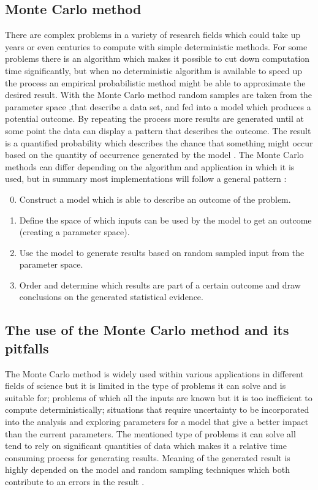 \subsection{Monte Carlo method}
There are complex problems in a variety of research fields which could take up years or even centuries to compute with simple deterministic methods. For some problems there is an algorithm which makes it possible to cut down computation time significantly, but when no deterministic algorithm is available to speed up the process an empirical probabilistic method might be able to approximate the desired result. With the Monte Carlo method random samples are taken from the parameter space ,that describe a data set, and fed into a model which produces a potential outcome. By repeating the process more results are generated until at some point the data can display a pattern that describes the outcome. The result is a quantified probability which describes the chance that something might occur based on the quantity of occurrence generated by the model \cite{}.
\newline
The Monte Carlo methods can differ depending on the algorithm and application in which it is used, but in summary most implementations will follow a general pattern \cite{}:
\begin{enumerate}
	\setcounter{enumi}{-1}
	\item Construct a model which is able to describe an outcome of the problem.
	\item Define the space of which inputs can be used by the model to get an outcome (creating a parameter space). 
	\item Use the model to generate results based on random sampled input from the parameter space.
	\item Order and determine which results are part of a certain outcome and draw conclusions on the generated statistical evidence.
\end{enumerate}

\label{subsec:Monte_Carlo_Method}

\subsection{The use of the Monte Carlo method and its pitfalls}
The Monte Carlo method is widely used within various applications in different fields of science but it is limited in the type of problems it can solve and is suitable for; problems of which all the inputs are known but it is too inefficient to compute deterministically; situations that require uncertainty to be incorporated into the analysis and exploring parameters for a model that give a better impact than the current parameters. The mentioned type of problems it can solve all tend to rely on significant quantities of data which makes it a relative time consuming process for generating results. Meaning of the generated result is highly depended on the model and random sampling techniques which both contribute to an errors in the result \cite{}.
